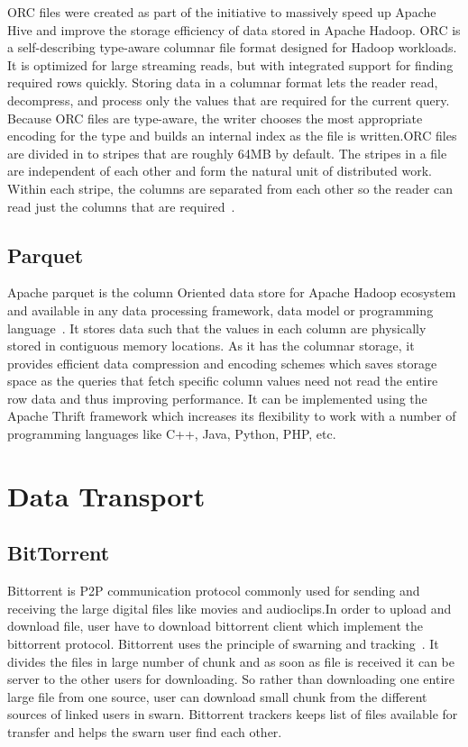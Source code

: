 {ORC files were created as part of the initiative to massively speed up
Apache Hive and improve the storage efficiency of data stored in
Apache Hadoop. ORC is a self-describing type-aware columnar file
format designed for Hadoop workloads. It is optimized for large
streaming reads, but with integrated support for finding required rows
quickly. Storing data in a columnar format lets the reader read,
decompress, and process only the values that are required for the
current query. Because ORC files are type-aware, the writer chooses
the most appropriate encoding for the type and builds an internal
index as the file is written.ORC files are divided in to stripes that
are roughly 64MB by default. The stripes in a file are independent of
each other and form the natural unit of distributed work. Within each
stripe, the columns are separated from each other so the reader can
read just the columns that are required~\cite{www-orc-docs}.

     
\subsection{Parquet}

Apache parquet is the column Oriented data store for Apache Hadoop
ecosystem and available in any data processing framework, data model
or programming language~\cite{www-parquet}. It stores data such that
the values in each column are physically stored in contiguous memory
locations. As it has the columnar storage, it provides efficient data
compression and encoding schemes which saves storage space as the
queries that fetch specific column values need not read the entire row
data and thus improving performance. It can be implemented using the
Apache Thrift framework which increases its flexibility to work with a
number of programming languages like C++, Java, Python, PHP, etc.
     
\section{Data Transport}
\label{S:o-data-transport}

\subsection{BitTorrent}

Bittorrent is P2P communication protocol commonly used for sending and
receiving the large digital files like movies and audioclips.In order
to upload and download file, user have to download bittorrent client
which implement the bittorrent protocol. Bittorrent uses the principle
of swarning and tracking~\cite{www-bittorrent}. It divides the files
in large number of chunk and as soon as file is received it can be
server to the other users for downloading.  So rather than downloading
one entire large file from one source, user can download small chunk
from the different sources of linked users in swarn. Bittorrent
trackers keeps list of files available for transfer and helps the
swarn user find each other.

}
